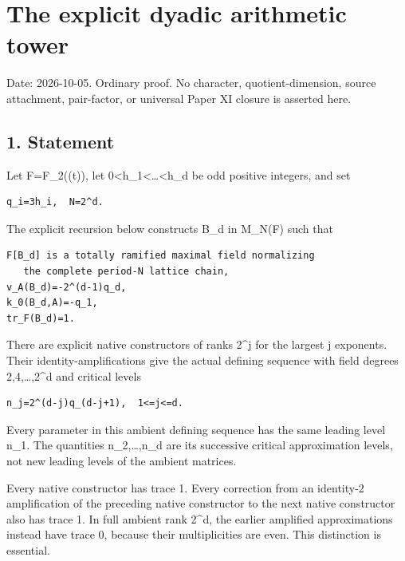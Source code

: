 \clearpage
\section{The explicit dyadic arithmetic tower}\label{app:dyadic_tower}

Date: 2026-10-05. Ordinary proof. No character, quotient-dimension,
source attachment, pair-factor, or universal Paper XI closure is
asserted here.

\hypertarget{dyadic_tower-statement}{%
\subsection{1. Statement}\label{dyadic_tower-statement}}

Let F=F\_2((t)), let 0\textless h\_1\textless\ldots\textless h\_d be odd
positive integers, and set

\begin{Verbatim}[fontsize=\small,breaklines=true,breakanywhere=true]
q_i=3h_i,  N=2^d.
\end{Verbatim}

The explicit recursion below constructs B\_d in M\_N(F) such that

\begin{Verbatim}[fontsize=\small,breaklines=true,breakanywhere=true]
F[B_d] is a totally ramified maximal field normalizing
   the complete period-N lattice chain,
v_A(B_d)=-2^(d-1)q_d,
k_0(B_d,A)=-q_1,
tr_F(B_d)=1.
\end{Verbatim}

There are explicit native constructors of ranks 2\^{}j for the largest j
exponents. Their identity-amplifications give the actual defining
sequence with field degrees 2,4,\ldots,2\^{}d and critical levels

\begin{Verbatim}[fontsize=\small,breaklines=true,breakanywhere=true]
n_j=2^(d-j)q_(d-j+1),  1<=j<=d.
\end{Verbatim}

Every parameter in this ambient defining sequence has the same leading
level n\_1. The quantities n\_2,\ldots,n\_d are its successive critical
approximation levels, not new leading levels of the ambient matrices.

Every native constructor has trace 1. Every correction from an
identity-2 amplification of the preceding native constructor to the next
native constructor also has trace 1. In full ambient rank 2\^{}d, the
earlier amplified approximations instead have trace 0, because their
multiplicities are even. This distinction is essential.

